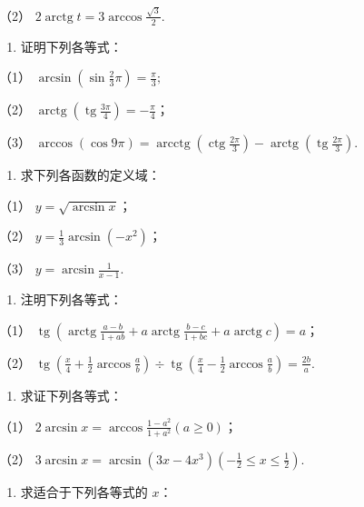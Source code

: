 （2） \(2\operatorname{arctg} t = 3\arccos \frac{\sqrt{3}}{2}\).

\begin{enumerate}[start=3]
\item
  证明下列各等式：
\end{enumerate}

（1） \(\arcsin \left(\sin \frac{2}{3}\pi\right) = \frac{\pi}{3};\)

（2）
\(\operatorname{arctg}\left(\operatorname{tg} \frac{3\pi}{4}\right) = -\frac{\pi}{4}\)；

（3）
\(\arccos (\cos 9\pi) = \operatorname{arcctg}\left(\operatorname{ctg} \frac{2\pi}{3}\right) - \operatorname{arctg}\left(\operatorname{tg} \frac{2\pi}{3}\right)\).

\begin{enumerate}[start=4]
\item
  求下列各函数的定义域：
\end{enumerate}

（1） \(y = \sqrt{\arcsin x}\)；

（2） \(y = \frac{1}{3} \arcsin (-x^2)\)；

（3） \(y = \arcsin \frac{1}{x - 1}\).

\begin{enumerate}[start=5]
\item
  注明下列各等式：
\end{enumerate}

（1）
\(\operatorname{tg}\left(\operatorname{arctg} \frac{a - b}{1 + ab} + a \operatorname{arctg} \frac{b - c}{1 + bc} + a \operatorname{arctg} c\right) = a\)；

（2）
\(\operatorname{tg}\left(\frac{x}{4} + \frac{1}{2} \arccos \frac{a}{b}\right) \div \operatorname{tg}\left(\frac{x}{4} - \frac{1}{2} \arccos \frac{a}{b}\right) = \frac{2b}{a}\).

\begin{enumerate}[start=6]
\item
  求证下列各等式：
\end{enumerate}

（1） \(2\arcsin x = \arccos \frac{1 - a^2}{1 + a^2} (a \geqslant 0)\)；

（2）
\(3\arcsin x = \arcsin (3x - 4x^3)\left(-\frac{1}{2} \leqslant x \leqslant \frac{1}{2}\right)\).

\begin{enumerate}[start=7]
\item
  求适合于下列各等式的 \(x\)：
\end{enumerate}


